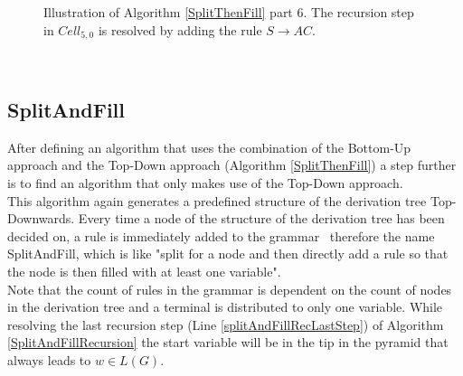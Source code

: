 \begin{figure} [h]
\begin{minipage}{6in}
{
		}
	\end{minipage}
	\caption{Illustration of Algorithm \ref{SplitThenFill} part 6. The recursion step in $Cell_{5,0}$ is  resolved by adding the rule $S\rightarrow AC$.}
	\label{IllustrationAlgorithmSplitThenFillPart6}
\end{figure}\\

\clearpage

\subsection{SplitAndFill}
After defining an algorithm that uses the combination of the Bottom-Up approach and the Top-Down approach (Algorithm \ref{SplitThenFill}) a step further is to find an algorithm that only makes use of the Top-Down approach.\\
This algorithm again generates a predefined structure of the derivation tree Top-Downwards. Every time a node of the structure of the derivation tree has been decided on, a rule is immediately added to the grammar \textendash~therefore the name SplitAndFill, which is like "split for a node and then directly add a rule so that the node is then filled with at least one variable". \\
Note that the count of rules in the grammar is dependent on the count of nodes in the derivation tree and a terminal is distributed to only one variable. While resolving the last recursion step (Line \ref{splitAndFillRecLastStep}) of Algorithm \ref{SplitAndFillRecursion} the start variable will be in the tip in the pyramid that always leads to $w \in L(G)$.\\


